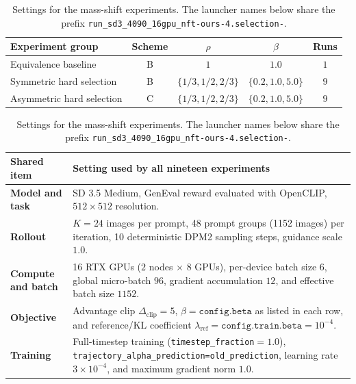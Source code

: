\begin{table}[H]
    \centering
    \caption{Settings for the mass-shift experiments.  The launcher
    names below share the prefix
    \texttt{run\_sd3\_4090\_16gpu\_nft-ours-4.selection-}.}
    \label{tab:mass-shift-hard-selection-sweep}
    \small
    \setlength{\tabcolsep}{4pt}
    \renewcommand{\arraystretch}{1.15}
    \begin{tabularx}{\textwidth}{@{}X c c c c@{}}
        \toprule
        Experiment group & Scheme & $\rho$ & $\beta$ & Runs \\
        \midrule
        Equivalence baseline & B & $1$ & $1.0$ & $1$ \\
        \midrule
        Symmetric hard selection & B
        & $\{1/3,1/2,2/3\}$ & $\{0.2,1.0,5.0\}$ & $9$ \\
        \midrule
        Asymmetric hard selection & C
        & $\{1/3,1/2,2/3\}$ & $\{0.2,1.0,5.0\}$ & $9$ \\
        \bottomrule
    \end{tabularx}


    \vspace{0.6em}
    \begin{tabularx}{\textwidth}{@{}>{\bfseries}l X@{}}
        \toprule
        Shared item & Setting used by all nineteen experiments \\
        \midrule
        Model and task
        & SD 3.5 Medium, GenEval reward evaluated with
          OpenCLIP, $512\times512$ resolution. \\
        Rollout
        & $K=24$ images per prompt, 48 prompt groups (1152 images) per
          iteration, 10 deterministic DPM2 sampling steps, guidance scale
          $1.0$. \\
        Compute and batch
        & 16 RTX GPUs ($2$ nodes $\times$ $8$ GPUs), per-device batch
          size $6$, global micro-batch $96$, gradient accumulation $12$, and
          effective batch size $1152$. \\
        Objective
        & Advantage clip $\Delta_{\mathrm{clip}}=5$,
          $\beta=\texttt{config.beta}$ as listed in each row,
          and reference/KL
          coefficient $\lambda_{\mathrm{ref}}=\texttt{config.train.beta}=10^{-4}$. \\
        Training
        & Full-timestep training
          (\texttt{timestep\_fraction}$=1.0$),
          \texttt{trajectory\_alpha\_prediction=old\_prediction}, learning rate $3\times10^{-4}$, and maximum gradient norm
          $1.0$. \\
        \bottomrule
    \end{tabularx}
\end{table}

